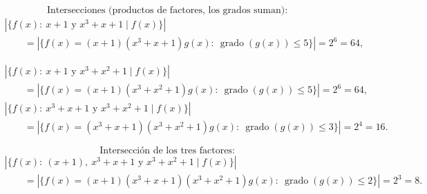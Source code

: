 \documentclass[a4paper,12pt]{article}
\begin{document}
\begin{ejercicio}[title=Ejercicio 10]

\[
\text{Intersecciones (productos de factores, los grados suman):}
\]
\[
\begin{aligned}
&\left|\{f(x):\ x+1 \text{ y } x^3+x+1 \mid f(x)\}\right|
\\[4pt]
&\qquad=\left|\{f(x)=(x+1)(x^3+x+1)g(x):\ \operatorname{grado}(g(x))\le 5\}\right|
= 2^{6}=64,
\end{aligned}
\]

\[
\begin{aligned}
&\left|\{f(x):\ x+1 \text{ y } x^3+x^2+1 \mid f(x)\}\right|
\\[4pt]
&\qquad=\left|\{f(x)=(x+1)(x^3+x^2+1)g(x):\ \operatorname{grado}(g(x))\le 5\}\right|
= 2^{6}=64,
\end{aligned}
\]
\[
\begin{aligned}
&\left|\{f(x):\ x^3+x+1 \text{ y } x^3+x^2+1 \mid f(x)\}\right|
\\[4pt]
&\qquad=\left|\{f(x)=(x^3+x+1)(x^3+x^2+1)g(x):\ \operatorname{grado}(g(x))\le 3\}\right|
= 2^{4}=16.
\end{aligned}
\]


\[
\text{Intersección de los tres factores:}
\]
\[
\begin{aligned}
&\left|\{f(x):\ (x+1),\ x^3+x+1 \text{ y } x^3+x^2+1 \mid f(x)\}\right|
\\[4pt]
&\qquad=\left|\{f(x)=(x+1)(x^3+x+1)(x^3+x^2+1)g(x):\ \operatorname{grado}(g(x))\le 2\}\right|
= 2^{3}=8.
\end{aligned}
\]

\end{ejercicio}
\end{document}
